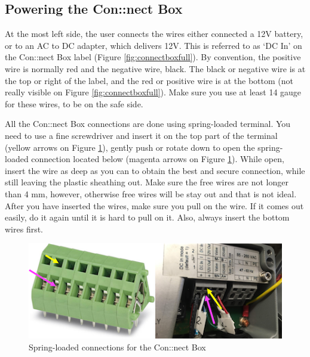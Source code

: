 \documentclass[]{book}
\begin{document}
\hypertarget{powering-the-connect-box}{%
\subsection{Powering the Con::nect Box}\label{powering-the-connect-box}}

At the most left side, the user connects the wires either connected a 12V battery, or to an AC to DC adapter, which delivers 12V. This is referred to as `DC In' on the Con::nect Box label (Figure \ref{fig:connectboxfull}). By convention, the positive wire is normally red and the negative wire, black. The black or negative wire is at the top or right of the label, and the red or positive wire is at the bottom (not really visible on Figure \ref{fig:connectboxfull}). Make sure you use at least 14 gauge for these wires, to be on the safe side.

All the Con::nect Box connections are done using spring-loaded terminal. You need to use a fine screwdriver and insert it on the top part of the terminal (yellow arrows on Figure \ref{fig:SpringLoadedTerminal}), gently push or rotate down to open the spring-loaded connection located below (magenta arrows on Figure \ref{fig:SpringLoadedTerminal}). While open, insert the wire as deep as you can to obtain the best and secure connection, while still leaving the plastic sheathing out. Make sure the free wires are not longer than 4 mm, however, otherwise free wires will be stay out and that is not ideal. After you have inserted the wires, make sure you pull on the wire. If it comes out easily, do it again until it is hard to pull on it. Also, always insert the bottom wires first.

\begin{figure}

{\centering \includegraphics[width=0.9\linewidth]{pictures/SpringLoadedConnections} 

}

\caption{Spring-loaded connections for the Con::nect Box}\label{fig:SpringLoadedTerminal}
\end{figure}
\end{document}
